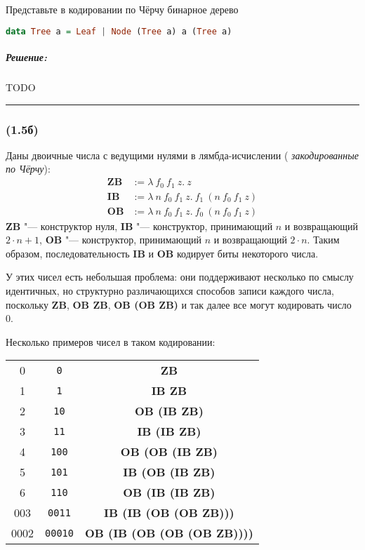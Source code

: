 \documentclass{article}
\newenvironment{proof}{\subparagraph{\hspace{-1em}Решение:\newline}}{\par\noindent\rule{\textwidth}{0.4pt}}
\renewcommand{\emph}[1]{{\color{blue} \textit{#1}}}
\begin{document}
    Представьте в кодировании по Чёрчу бинарное дерево
    \begin{lstlisting}[language=Haskell]
    data Tree a = Leaf | Node (Tree a) a (Tree a)
    \end{lstlisting}

    \begin{proof}
        TODO %
    \end{proof}

    \subsubsection{(1.5б)}

    Даны двоичные числа с ведущими нулями в лямбда-исчислении
    (\emph{закодированные по Чёрчу}):
    $$\begin{array}{ll}
        \mathbf{ZB}&:= \lambda~f_0~f_1~z.~z \\
        \mathbf{IB}&:= \lambda~n~f_0~f_1~z.~f_1~(n~f_0~f_1~z) \\
        \mathbf{OB}&:= \lambda~n~f_0~f_1~z.~f_0~(n~f_0~f_1~z)
    \end{array}$$
    \textbf{ZB} "--- конструктор нуля, \textbf{IB} "--- конструктор,
    принимающий $n$ и возвращающий $2 \cdot n + 1$, \textbf{OB} "---
    конструктор, принимающий $n$ и возвращающий $2 \cdot n$. Таким
    образом, последовательность \textbf{IB} и \textbf{OB} кодирует биты
    некоторого числа.

    У этих чисел есть небольшая проблема: они поддерживают несколько по смыслу
    идентичных, но структурно различающихся способов записи каждого числа,
    поскольку \textbf{ZB}, \textbf{OB ZB}, \textbf{OB (OB ZB)} и так далее все
    могут кодировать число 0.

    Несколько примеров чисел в таком кодировании:
    \begin{center}
        \begin{tabular}{|c|c|c|}
            \hline
            0 & \texttt{0} & \textbf{ZB} \\
            1 & \texttt{1} & \textbf{IB ZB} \\
            2 & \texttt{10} & \textbf{OB (IB ZB)} \\
            3 & \texttt{11} & \textbf{IB (IB ZB)} \\
            4 & \texttt{100} & \textbf{OB (OB (IB ZB)} \\
            5 & \texttt{101} & \textbf{IB (OB (IB ZB)} \\
            6 & \texttt{110} & \textbf{OB (IB (IB ZB)} \\
            003 & \texttt{0011} & \textbf{IB (IB (OB (OB ZB)))} \\
            0002 & \texttt{00010} & \textbf{OB (IB (OB (OB (OB ZB))))} \\
            \hline
        \end{tabular}
    \end{center}
\end{document}
